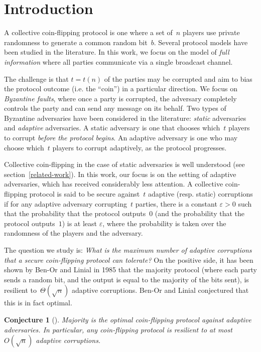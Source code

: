 \documentclass[11pt,letterpaper]{article}
\theoremstyle{plain}
\newtheorem{conjecture}[theorem]{Conjecture}
\theoremstyle{definition}
\newcommand{\eps}{\varepsilon}
\begin{document}
\section{Introduction}



A collective coin-flipping protocol is one where a set of~$n$ players use private randomness to generate a common random bit~$b$.  Several protocol models have been studied in the literature.  In this work, we focus on the  model of {\em full information} \cite{BL85} where all parties communicate via a single broadcast channel.  


The challenge is that $t=t(n)$ of the parties may be corrupted and aim to bias the protocol outcome (i.e. the ``coin'') in a particular direction.  We focus on {\em Byzantine faults}, where once a party is corrupted, the adversary completely controls the party and can send any message on its behalf. Two types of Byzantine adversaries have been considered in the literature: {\em static} adversaries and {\em adaptive} adversaries.  A static adversary is one that chooses which~$t$ players to corrupt {\em before the protocol begins}.  An adaptive adversary is one who may choose which~$t$ players to corrupt adaptively, as the protocol progresses. 

Collective coin-flipping in the case of static adversaries is well understood (see section~\ref{related-work}).   
In this work, our focus is on the setting of adaptive adversaries, which has received considerably less attention. 
A collective coin-flipping protocol is said to be secure against~$t$ adaptive (resp. static) corruptions if for any adaptive adversary corrupting~$t$ parties, there is a constant $\eps>0$ such that the probability that the protocol outputs~$0$ (and the probability that the protocol outputs~$1$) is at least $\eps$, where the probability is taken over the randomness of the players and the adversary.  


The question we study is: {\em What is the maximum number of adaptive corruptions that a secure coin-flipping protocol can tolerate?} On the positive side, it has been shown by Ben-Or and Linial \cite{BL85} in 1985 that 
the majority protocol (where each party sends a random bit, and the output is equal to the majority of the bits sent), is resilient to~$\Theta(\sqrt n)$ adaptive corruptions.
Ben-Or and Linial conjectured that this is in fact optimal.
\begin{conjecture}[\cite{BL85}]\label{conj:coinFlipping}
Majority is the optimal coin-flipping protocol against adaptive adversaries.
In particular, any coin-flipping protocol is resilient to at most $O(\sqrt n)$ adaptive corruptions.
\end{conjecture}
\end{document}
